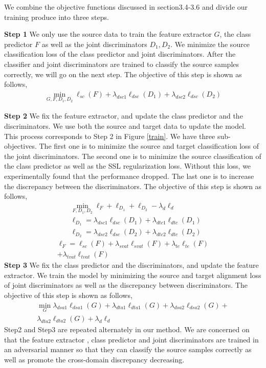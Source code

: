 \documentclass{ecai}
\begin{document}
We combine the objective functions discussed in section3.4-3.6 and divide our training produce into three steps.

\textbf{Step 1} We only use the source data to train the feature extractor $G$, the class predictor $F$ as well as the joint discriminators $D_1,D_2$.  We minimize the source classification loss of the class predictor and joint discriminators. After the classifier and joint discriminators are trained to classify the source samples correctly, we will go on the next step. The objective of this step is shown as follows,
\begin{align}
\min_{G,F,D_1,D_2} \ell_{sc}(F) + \lambda_{dsc1}\ell_{dsc}(D_1) + \lambda_{dsc2}\ell_{dsc}(D_2)
\end{align}

\textbf{Step 2} We fix the feature extractor, and update the class predictor and the discriminators. We use both the source and target data to update the model. This process corresponds to Step 2 in Figure \ref{train}. We have three sub-objectives. The first one is to minimize the source and target classification loss of the joint discriminators. The second one is to minimize the source classification of the class predictor as well as  the SSL regularization loss. Without this loss, we experimentally found that the performance dropped. The last one is to increase the discrepancy between the discriminators. The objective of this step is shown as follows,
\begin{align}
&\min_{F,D_1,D_2}  \ell_F+ \ell_{D_1} + \ell_{D_2} - \lambda_{d} \ell_{d} \\
&\ell_{D_1} =  \lambda_{dsc1}\ell_{dsc}(D_1) +  \lambda_{dtc1}\ell_{dtc}(D_1) \\
&\ell_{D_2} =  \lambda_{dsc2}\ell_{dsc}(D_2) +  \lambda_{dtc2}\ell_{dtc}(D_2)
\end{align}
\begin{equation}
\begin{aligned}
\ell_F = \ell_{sc}(F) + \lambda_{svat}\ell_{svat}(F) + \lambda_{te}\ell_{te}(F) \\ + \lambda_{tvat}\ell_{tvat}(F)
\end{aligned}
\end{equation}
\textbf{Step 3} We fix the class predictor and the discriminators, and update the feature extractor. We train the model by minimizing the source and target alignment loss of joint discriminators as well as the discrepancy between discriminators. The objective of this step is shown as follows,
\begin{equation}
\begin{aligned}
\min_{G}  \lambda_{dsa1}\ell_{dsa1}(G) + \lambda_{dta1}\ell_{dta1}(G) + \lambda_{dsa2}\ell_{dsa2}(G) + \\
\lambda_{dta2}\ell_{dta2}(G) + \lambda_{d}\ell_{d}
\end{aligned}
\end{equation}
Step2 and Step3 are repeated alternately in our method. We are concerned on that the feature extractor , class predictor and joint discriminators are trained in an adversarial manner so that they can classify the source samples correctly as well as promote the cross-domain discrepancy decreasing.
\end{document}
